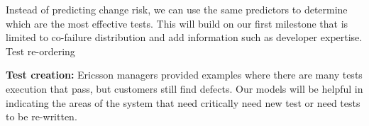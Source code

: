 Instead of predicting change risk, we can use the same predictors to determine which are the most effective tests. This will build on our first milestone that is limited to co-failure distribution and add information such as developer expertise.  Test re-ordering 

\textbf{Test creation:} Ericsson managers provided examples where there are many tests execution that pass, but customers still find defects. Our models will be helpful in indicating the areas of the system that need critically need new test or need tests to be re-written.


